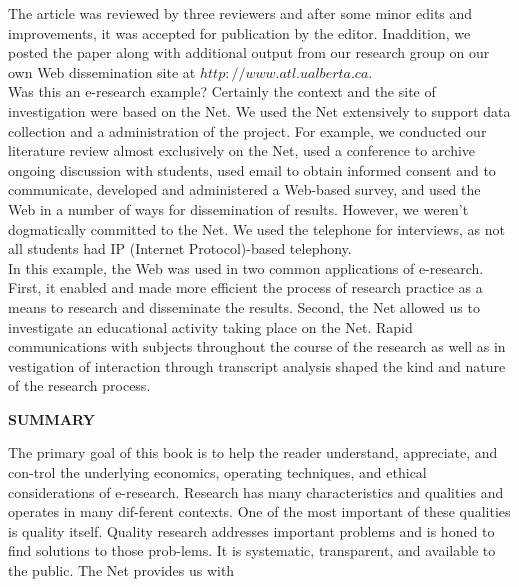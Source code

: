 \documentclass[8pt]{beamer}
\begin{document}
\begin{frame}
\small{ The article was reviewed by three reviewers and after some minor edits and improvements, it was accepted for publication by the editor. Inaddition, we posted the paper along with additional output from our research group on our own Web dissemination site at $http://www.atl.ualberta.ca.$\\
 \hspace*{0.4cm} Was this an e-research example? Certainly the context and the site of investigation were based on the Net. We used the Net extensively to support data collection and a administration of the project. For example, we conducted our literature review almost exclusively on the Net, used a conference to archive ongoing discussion with students, used email to obtain informed consent and to communicate, developed and administered a Web-based survey, and used the Web in a number of ways for dissemination of results. However, we weren't dogmatically committed to the Net. We used the telephone for interviews, as not all students had IP (Internet Protocol)-based telephony.\\
 In this example, the Web was used in two common applications of e-research. First, it enabled and made more efficient the process of research practice as a means to research and disseminate the results. Second, the Net allowed us to investigate an educational activity taking place on the Net. Rapid communications with subjects throughout the course of the research as well as in vestigation of interaction through transcript analysis shaped the kind and nature of the research process.}\\

 \vspace*{0.6cm}
\end{frame}

\begin{frame}
\large{
\textbf{SUMMARY}
}

\vspace*{0.3cm}
The primary goal of this book is to help the reader understand, appreciate, and con-trol the underlying economics, operating techniques, and ethical considerations of e-research. Research has many characteristics and qualities and operates in many dif-ferent contexts. One of the most important of these qualities is quality itself. Quality research addresses important problems and is honed to find solutions to those prob-lems. It is systematic, transparent, and available to the public. The Net provides us with \\
\end{frame}
\end{document}
